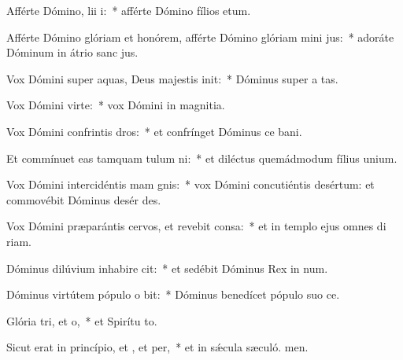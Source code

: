 \item Afférte Dómino, lii i:~* afférte Dómino fílios etum.
\item Afférte Dómino glóriam et honórem, afférte Dómino glóriam mini jus:~* adoráte Dóminum in átrio sanc jus.
\item Vox Dómini super aquas, Deus majestis init:~* Dóminus super a tas.
\item Vox Dómini  virte:~* vox Dómini in magnitia.
\item Vox Dómini confrintis dros:~* et confrínget Dóminus ce bani.
\item Et commínuet eas tamquam tulum ni:~* et diléctus quemádmodum fílius unium.
\item Vox Dómini intercidéntis mam gnis:~* vox Dómini concutiéntis desértum: et commovébit Dóminus desér des.
\item Vox Dómini præparántis cervos, et revebit consa:~* et in templo ejus omnes di riam.
\item Dóminus dilúvium inhabire cit:~* et sedébit Dóminus Rex in num.
\item Dóminus virtútem pópulo o bit:~* Dóminus benedícet pópulo suo  ce.
\item Glória tri, et o,~* et Spirítu to.
\item Sicut erat in princípio, et , et per,~* et in sǽcula sæculó. men.
